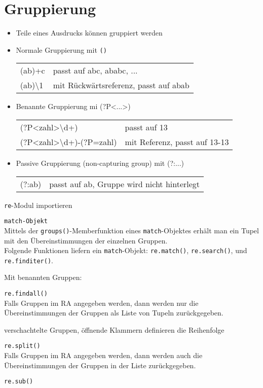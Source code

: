 \section{Gruppierung}
\begin{itemize}
	\item Teile eines Ausdrucks können gruppiert werden
	\item Normale Gruppierung mit \texttt{()}\\
	\begin{tabular}{ll}
		(ab)+c& passt auf abc, ababc, ...\\
		(ab)\textbackslash1& mit Rückwärtsreferenz, passt auf abab\\
	\end{tabular}
	\item Benannte Gruppierung mi (?P<...>)\\
	\begin{tabular}{ll}
		(?P<zahl>\textbackslash d+)& passt auf 13\\
		(?P<zahl>\textbackslash d+)-(?P=zahl)& mit Referenz, passt auf 13-13\\
	\end{tabular}
	\item Passive Gruppierung (non-capturing group) mit (?:...)\\
	\begin{tabular}{ll}
		(?:ab)& passt auf ab, Gruppe wird nicht hinterlegt\\
	\end{tabular}
\end{itemize}
\texttt{re}-Modul importieren

\texttt{match-Objekt}\\
Mittels der \texttt{groups()}-Memberfunktion eines \texttt{match}-Objektes erhält man ein Tupel mit den Übereinstimmungen der einzelnen Gruppen.\\
Folgende Funktionen liefern ein \texttt{match}-Objekt: \texttt{re.match()}, \texttt{re.search()}, und \texttt{re.finditer()}.

Mit benannten Gruppen:

\texttt{re.findall()}\\
Falls Gruppen im RA angegeben werden, dann werden nur die Übereinstimmungen der Gruppen als Liste von Tupeln zurückgegeben.

verschachtelte Gruppen, öffnende Klammern definieren die Reihenfolge

\texttt{re.split()}\\
Falls Gruppen im RA angegeben werden, dann werden auch die Übereinstimmungen der Gruppen in der Liste zurückgegeben.

\texttt{re.sub()}\\


